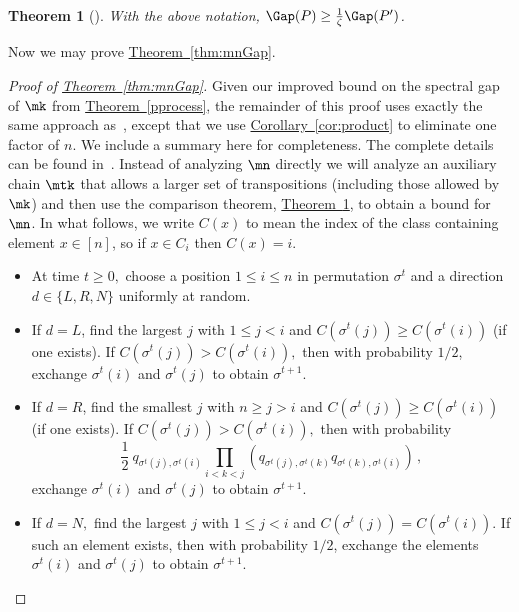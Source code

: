 \documentclass[11pt]{article}
\newtheorem{theorem}{Theorem}[section]
\providecommand{\expref}[2]{\texorpdfstring{\hyperref[#2]{#1~\ref{#2}}}{#1~\ref{#2}}}
\begin{document}
\begin{theorem}[\cite{dsc}]\label{thm_comp}
With the above notation, $\Gap(P)\geq \frac{1}{\zeta} \Gap(P')$.
\end{theorem}

Now we may prove \expref{Theorem}{thm:mnGap}.\\

%
\begin{proof}[Proof of \expref{Theorem}{thm:mnGap}]
Given our improved bound on the spectral gap of $\mk$ from
\expref{Theorem}{pprocess}, the remainder of this proof uses exactly the
same approach as~\cite{MS}, except that we use \expref{Corollary}{cor:product}
to eliminate one factor of $n$.  We include a summary here for
completeness.  The complete details can be found in~\cite{MS}.
Instead of analyzing $\mn$ directly we will analyze an auxiliary chain
$\mtk$ that allows a larger set of transpositions (including those
allowed by $\mk$) and then use the comparison theorem, \expref{Theorem}{thm_comp},
to obtain a bound for $\mn$.   
In what follows, we write $C(x)$ to mean the index of the class containing element $x\in [n]$, so if $x\in C_i$ then $C(x)=i$.

\vspace{.1in}

\vspace{.05in}
\begin{itemize}
\item At time $t\geq0,$ choose a position $1\leq i \leq n$ in permutation $\sigma^t$ and a direction $d \in \{L, R,N\}$ uniformly at random.  
\item If $d = L$, find the largest $j$ with $1 \leq j<i$ and $C(\sigma^t(j)) \geq C(\sigma^t(i))$ (if one exists).  If $C(\sigma^t(j)) > C(\sigma^t(i)),$ then 
with probability $1/2$,
exchange $\sigma^t(i)$ and $\sigma^t(j)$ to obtain $\sigma^{t+1}.$  
\item If $d = R$, find the smallest $j$ with $n\geq j>i$ and $C(\sigma^t(j)) \geq C(\sigma^t(i))$ (if one exists).  If $C(\sigma^t(j)) > C(\sigma^t(i)),$ then with probability 
$$\frac{1}{2}~ q_{\sigma^t(j),\sigma^t(i)}  \prod_{i<k<j}\left(q_{\sigma^t(j),\sigma^t(k)}q_{\sigma^t(k),\sigma^t(i)}\right)\,,$$
exchange $\sigma^t(i)$ and $\sigma^t(j)$ to obtain $\sigma^{t+1}.$  
\item If $d = N,$  find the largest $j$ with $1\leq j<i$ and $C(\sigma^t(j)) = C(\sigma^t(i)).$  If such an element exists, then with probability $1/2$, exchange the elements $\sigma^t(i)$ and $\sigma^t(j)$ to obtain $\sigma^{t+1}.$ 


\end{itemize}
\end{proof}
\end{document}

